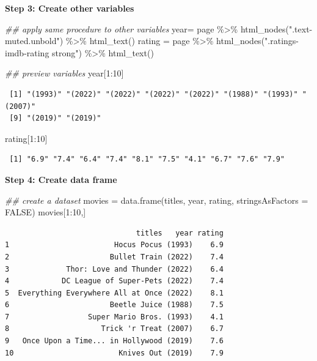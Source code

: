 \documentclass[
  letterpaper,
  DIV=11,
  numbers=noendperiod]{scrreprt}
\newenvironment{Shaded}{\begin{snugshade}}{\end{snugshade}}
\newcommand{\AttributeTok}[1]{\textcolor[rgb]{0.40,0.45,0.13}{#1}}
\newcommand{\ConstantTok}[1]{\textcolor[rgb]{0.56,0.35,0.01}{#1}}
\newcommand{\DecValTok}[1]{\textcolor[rgb]{0.68,0.00,0.00}{#1}}
\newcommand{\DocumentationTok}[1]{\textcolor[rgb]{0.37,0.37,0.37}{\textit{#1}}}
\newcommand{\FunctionTok}[1]{\textcolor[rgb]{0.28,0.35,0.67}{#1}}
\newcommand{\NormalTok}[1]{\textcolor[rgb]{0.00,0.23,0.31}{#1}}
\newcommand{\OtherTok}[1]{\textcolor[rgb]{0.00,0.23,0.31}{#1}}
\newcommand{\SpecialCharTok}[1]{\textcolor[rgb]{0.37,0.37,0.37}{#1}}
\newcommand{\StringTok}[1]{\textcolor[rgb]{0.13,0.47,0.30}{#1}}
\begin{document}
\textbf{Step 3: Create other variables}

\begin{Shaded}
\begin{Highlighting}[]
\DocumentationTok{\#\# apply same procedure to other variables}
\NormalTok{year}\OtherTok{=}\NormalTok{ page }\SpecialCharTok{\%\textgreater{}\%} \FunctionTok{html\_nodes}\NormalTok{(}\StringTok{".text{-}muted.unbold"}\NormalTok{) }\SpecialCharTok{\%\textgreater{}\%} \FunctionTok{html\_text}\NormalTok{()}
\NormalTok{rating }\OtherTok{=}\NormalTok{ page }\SpecialCharTok{\%\textgreater{}\%} \FunctionTok{html\_nodes}\NormalTok{(}\StringTok{".ratings{-}imdb{-}rating strong"}\NormalTok{) }\SpecialCharTok{\%\textgreater{}\%} \FunctionTok{html\_text}\NormalTok{()}


\DocumentationTok{\#\# preview variables}
\NormalTok{year[}\DecValTok{1}\SpecialCharTok{:}\DecValTok{10}\NormalTok{]}
\end{Highlighting}
\end{Shaded}

\begin{verbatim}
 [1] "(1993)" "(2022)" "(2022)" "(2022)" "(2022)" "(1988)" "(1993)" "(2007)"
 [9] "(2019)" "(2019)"
\end{verbatim}

\begin{Shaded}
\begin{Highlighting}[]
\NormalTok{rating[}\DecValTok{1}\SpecialCharTok{:}\DecValTok{10}\NormalTok{]}
\end{Highlighting}
\end{Shaded}

\begin{verbatim}
 [1] "6.9" "7.4" "6.4" "7.4" "8.1" "7.5" "4.1" "6.7" "7.6" "7.9"
\end{verbatim}

\textbf{Step 4: Create data frame}

\begin{Shaded}
\begin{Highlighting}[]
\DocumentationTok{\#\# create a dataset}
\NormalTok{movies }\OtherTok{=} \FunctionTok{data.frame}\NormalTok{(titles, year, rating, }\AttributeTok{stringsAsFactors =} \ConstantTok{FALSE}\NormalTok{)}
\NormalTok{movies[}\DecValTok{1}\SpecialCharTok{:}\DecValTok{10}\NormalTok{,]}
\end{Highlighting}
\end{Shaded}

\begin{verbatim}
                              titles   year rating
1                        Hocus Pocus (1993)    6.9
2                       Bullet Train (2022)    7.4
3             Thor: Love and Thunder (2022)    6.4
4            DC League of Super-Pets (2022)    7.4
5  Everything Everywhere All at Once (2022)    8.1
6                       Beetle Juice (1988)    7.5
7                  Super Mario Bros. (1993)    4.1
8                     Trick 'r Treat (2007)    6.7
9   Once Upon a Time... in Hollywood (2019)    7.6
10                        Knives Out (2019)    7.9
\end{verbatim}
\end{document}
